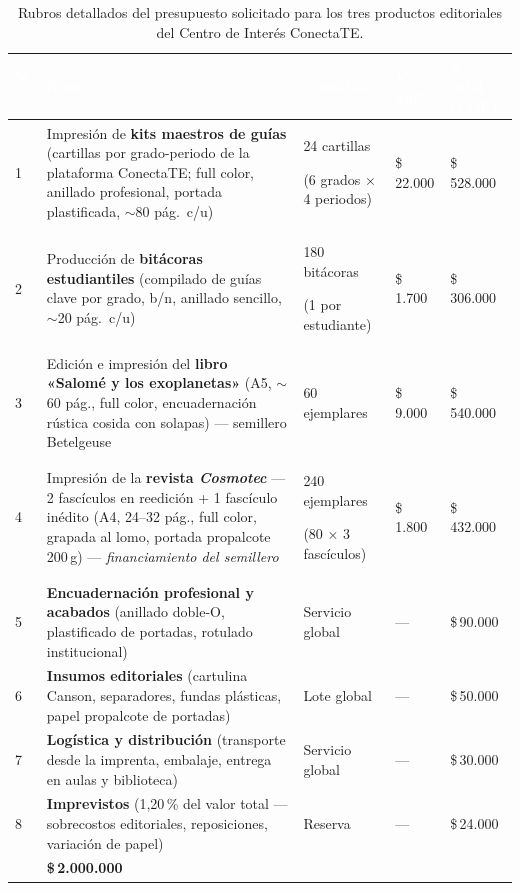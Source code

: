 \documentclass[12pt, letterpaper]{article}
\newcommand{\pesos}[1]{\$\,#1}
\begin{document}
\renewcommand{\arraystretch}{1.28}
\begin{table}[H]
\centering
\footnotesize
{}
\begin{tabularx}{\linewidth}{C{0.6cm} L{5.5cm} C{2.0cm} R{1.9cm} R{2.2cm}}
\toprule
{}
\textcolor{white}{\textbf{N.°{}}} & \textcolor{white}{\textbf{Rubro}} & \textcolor{white}{\textbf{Cantidad}} & \textcolor{white}{\textbf{V. unit.}} & \textcolor{white}{\textbf{V. total (COP)}} \\
 & Impresión de \textbf{kits maestros de guías} (cartillas por grado-periodo de la plataforma ConectaTE; full color, anillado profesional, portada plastificada, $\sim$80 pág.\ c/u) & 24 cartillas\par(6 grados × 4 periodos) & \pesos{22.000} & \pesos{528.000} \\
2 & Producción de \textbf{bitácoras estudiantiles} (compilado de guías clave por grado, b/n, anillado sencillo, $\sim$20 pág.\ c/u) & 180 bitácoras\par(1 por estudiante) & \pesos{1.700} & \pesos{306.000} \\
3 & Edición e impresión del \textbf{libro «Salomé y los exoplanetas»} (A5, $\sim$60 pág., full color, encuadernación rústica cosida con solapas) — semillero Betelgeuse & 60 ejemplares & \pesos{9.000} & \pesos{540.000} \\
4 & Impresión de la \textbf{revista \emph{Cosmotec}} — 2 fascículos en reedición + 1 fascículo inédito (A4, 24--32 pág., full color, grapada al lomo, portada propalcote 200\,g) — \textit{financiamiento del semillero} & 240 ejemplares\par(80 × 3 fascículos) & \pesos{1.800} & \pesos{432.000} \\
5 & \textbf{Encuadernación profesional y acabados} (anillado doble-O, plastificado de portadas, rotulado institucional) & Servicio global & --- & \pesos{90.000} \\
6 & \textbf{Insumos editoriales} (cartulina Canson, separadores, fundas plásticas, papel propalcote de portadas) & Lote global & --- & \pesos{50.000} \\
7 & \textbf{Logística y distribución} (transporte desde la imprenta, embalaje, entrega en aulas y biblioteca) & Servicio global & --- & \pesos{30.000} \\
8 & \textbf{Imprevistos} (1{,}20\,\% del valor total — sobrecostos editoriales, reposiciones, variación de papel) & Reserva & --- & \pesos{24.000} \\
\midrule
{}
 & \textbf{\color{smjAzul}\pesos{2.000.000}} \\
\bottomrule
\end{tabularx}
\caption{Rubros detallados del presupuesto solicitado para los tres productos editoriales del Centro de Interés ConectaTE.}
\end{table}
\end{document}
